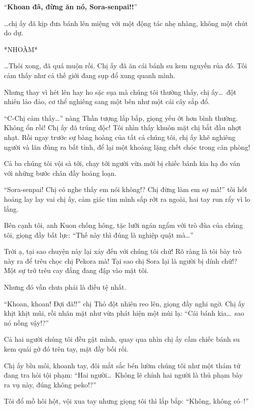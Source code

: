 \documentclass[../main.tex]{subfiles}
\begin{document}
``\textbf{Khoan đã, đừng ăn nó, Sora-senpai!!}''

\dots chị ấy đã kịp đưa bánh lên miệng với một động tác nhẹ nhàng, không một chút do dự.

*NHOÀM*

\dots Thôi xong, đã quá muộn rồi. Chị ấy đã ăn cái bánh su kem nguyền rủa đó. Tôi cảm thấy như cả thế giới đang sụp đổ xung quanh mình.

Nhưng thay vì hét lên hay ho sặc sụa mà chúng tôi thường thấy, chị ấy\dots\ đột nhiên lảo đảo, cơ thể nghiêng sang một bên như một cái cây sắp đổ.

``C-Chị cảm thấy\dots'' nàng Thần tượng lắp bắp, giọng yếu ớt hơn bình thường. Không ổn rồi! Chị ấy đã trúng độc! Tôi nhìn thấy khuôn mặt chị bắt đầu nhợt nhạt. Rồi ngay trước sự bàng hoàng của tất cả chúng tôi, chị ấy khẽ nghiêng người và lăn đùng ra bất tỉnh, để lại một khoảng lặng chết chóc trong căn phòng!

Cả ba chúng tôi vội sà tới, chạy tới người vừa mới bị chiếc bánh kia hạ đo ván với những bước chân đầy hoảng loạn.

``Sora-senpai! Chị có nghe thấy em nói không!? Chị đừng làm em sợ mà!'' tôi hốt hoảng lay lay vai chị ấy, cảm giác tim mình sắp rớt ra ngoài, hai tay run rẩy vì lo lắng.

Bên cạnh tôi, anh Kuon chống hông, tặc lưỡi ngán ngẩm với trò đùa của chúng tôi, giọng đầy bất lực: ``Thế này thì đúng là nghiệp quật mà\dots''

Trời ạ, tại sao chuyện này lại xảy đến với chúng tôi chứ! Rõ ràng là tôi bày trò này ra để trêu chọc chị Pekora mà! Tại sao chị Sora lại là người bị dính chứ!? Một sự trớ trêu cay đắng đang đập vào mặt tôi.

Nhưng đó vẫn chưa phải là điều tệ nhất.

``Khoan, khoan! Đợi đã!!'' chị Thỏ đột nhiên reo lên, giọng đầy nghi ngờ. Chị ấy khịt khịt mũi, rồi nhăn mặt như vừa phát hiện một mùi lạ: ``Cái bánh kia\dots\ sao nó nồng vậy!?''

Cả hai người chúng tôi đều gật mình, quay qua nhìn chị ấy cầm chiếc bánh su kem quái gở đó trên tay, mặt đầy bối rối.

Chị ấy bĩu môi, khoanh tay, đôi mắt sắc bén lườm chúng tôi như một thám tử đang tra hỏi tội phạm: ``Hai người\dots\ Không lẽ chính hai người là thủ phạm bày ra vụ này, đúng không peko!?''

Tôi đổ mồ hôi hột, vội xua tay nhưng giọng tôi thì lắp bắp: ``Không, không có--!''
\end{document}
